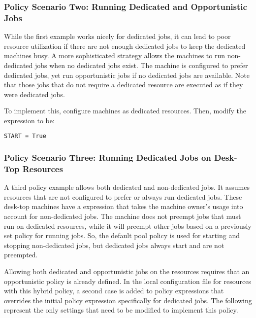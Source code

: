 \subsubsection{\label{sec:Configure-Dedicated-Ex2}
Policy Scenario Two: Running Dedicated and Opportunistic Jobs}

While the first example works nicely for dedicated jobs,
it can 
lead to poor resource utilization if there are not enough dedicated
jobs to keep the dedicated machines busy.  
A more sophisticated strategy allows 
the machines to run non-dedicated jobs when no dedicated jobs exist.
The machine is
configured to prefer dedicated jobs, yet
run opportunistic jobs if no dedicated jobs are available.
Note that those jobs that do not require a dedicated resource
are executed as if they were dedicated jobs.

To implement this,
configure machines as dedicated resources.
Then, modify the  expression to be:

\begin{verbatim}
START = True
\end{verbatim}

\subsubsection{\label{sec:Configure-Dedicated-Ex3}
Policy Scenario Three: Running Dedicated Jobs on Desk-Top Resources}

A third policy example allows both dedicated and non-dedicated
jobs.
It assumes resources that are not
configured to prefer or always run dedicated jobs.
These desk-top machines have a  expression that
takes the machine owner's usage into account for non-dedicated
jobs.
The machine does not preempt jobs that must run on dedicated
resources,
while it will preempt other jobs based on a previously set
policy for running jobs.
So, the default pool policy is used for starting and
stopping non-dedicated jobs, but dedicated jobs always start 
and are not preempted.

Allowing both dedicated and opportunistic jobs on the resources
requires that an opportunistic policy is already defined.
In the local configuration file for resources with this hybrid policy,
a second case is added to policy expressions that overrides
the initial policy expression specifically for
dedicated jobs.
The following represent the only settings that need to be modified
to implement this policy. 

